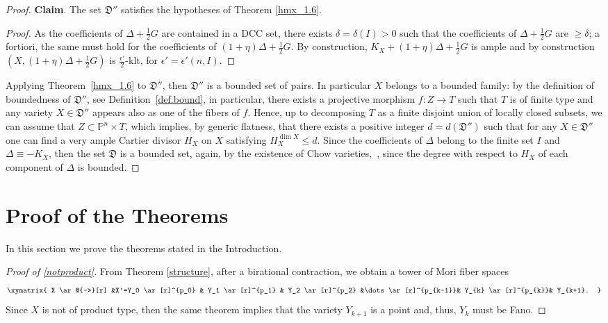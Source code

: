 \documentclass{amsart}[12pt,a4paper]
\theoremstyle{definition}
\begin{document}
\begin{proof}
{\bf Claim}.
The set $\mathfrak{D}''$ satisfies the hypotheses of Theorem \ref{hmx_1.6}. 
\begin{proof}
As the coefficients of $\Delta+\frac 1 2 G$ are contained in a DCC set, there exists $\delta=\delta(I) >0$ such that the coefficients of $\Delta+\frac 1 2 G$ are $\geq \delta$; 
a fortiori, the same must hold for the coefficients of $(1+\eta)\Delta+\frac 1 2 G$.
By construction, $K_X+(1+\eta)\Delta+\frac 1 2 G$ is ample and by construction $(X, (1+\eta)\Delta+\frac 1 2 G)$ is $\frac{\epsilon'}{2}$-klt, for $\epsilon'=\epsilon'(n, I)$.
\end{proof}
Applying Theorem~\ref{hmx_1.6} to $\mathfrak{D}''$, then $\mathfrak{D}''$ is a bounded set of pairs. 
In particular $X$ belongs to a bounded family:
by the definition of boundedness of $\mathfrak{D}''$, see Definition~\ref{def.bound}, in particular, there exists a projective morphism $f \colon Z \to T$ such that $T$ is of finite type and any variety $X \in \mathfrak{D}''$ appears also as one of the fibers of $f$.
Hence, up to decomposing $T$ as a finite disjoint union of locally closed subsets, we can assume that $Z \subset \mathbb{P}^n \times T$, which implies, by generic flatness, that there exists a positive integer $d=d(\mathfrak{D}'')$ such that for any $X \in \mathfrak{D}''$ one can find a very ample Cartier divisor $H_X$ on $X$ satisfying $H_X^{\dim X} \leq d$.
Since the coefficients of $\Delta$ belong to the finite set $I$ and $\Delta \equiv -K_X$, then the set $\mathfrak{D}$ is a bounded set, again, by the existence of Chow varieties,~\cite[Theorem~3.12]{Kol96}, since the degree with respect to $H_X$ of each component of $\Delta$ is bounded.
\end{proof}		



\section{Proof of the Theorems}
\label{sec.proofs}

In this section we prove the theorems stated in the Introduction.

\begin{proof}[Proof of \ref{notproduct}]
From Theorem \ref{structure}, after a birational contraction,  we obtain a tower of Mori fiber spaces
\begin{align*}
\xymatrix{
	X \ar@{-->}[r] &X'=Y_0 \ar[r]^{p_0} & Y_1 \ar[r]^{p_1} & Y_2 \ar[r]^{p_2} &\dots \ar[r]^{p_{k-1}}& Y_{k} \ar[r]^{p_{k}}& Y_{k+1}.
}
\end{align*}
Since $X$ is not of product type, then the same theorem implies that the variety $Y_{k+1}$ is a point and, thus, $Y_k$ must be Fano.
\end{proof}
\end{document}
